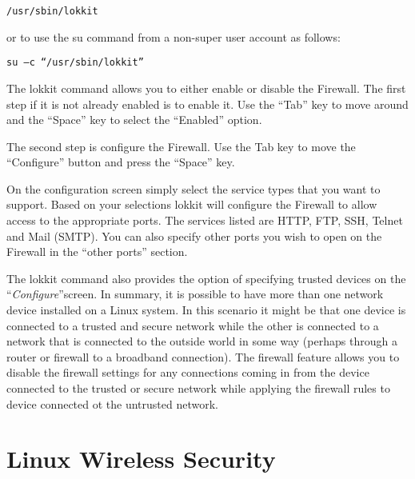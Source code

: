 \begin{verbatim}
/usr/sbin/lokkit
\end{verbatim}



or to use the su command from a non-super user account as follows: 



\begin{verbatim}
su –c “/usr/sbin/lokkit”
\end{verbatim}



The lokkit command allows you to either enable or disable the Firewall. The
first step if it is not already enabled is to enable it. Use the “Tab” key to
move around and the “Space” key to select the “Enabled” option.



The second step is configure the Firewall. Use the Tab key to move the
“Configure” button and press the “Space” key.



On the configuration screen simply select the service types that you want to
support. Based on your selections lokkit will configure the Firewall to allow
access to the appropriate ports. The services listed are HTTP, FTP, SSH, Telnet
and Mail (SMTP). You can also specify other ports you wish to open on the
Firewall in the “other ports” section.



The lokkit command also provides the option of specifying trusted devices on the
``{\textit{Configure}}''screen. In summary, it is possible to have more than one
network device installed on a Linux system. In this scenario it might be that
one device is connected to a trusted and secure network while the other is
connected to a network that is connected to the outside world in some way
(perhaps through a router or firewall to a broadband connection). The firewall
feature allows you to disable the firewall settings for any connections coming
in from the device connected to the trusted or secure network while applying the
firewall rules to device connected ot the untrusted network.



\subsectionend

\sectionend

\section{Linux Wireless Security}
\label{sec:wireless_security}



